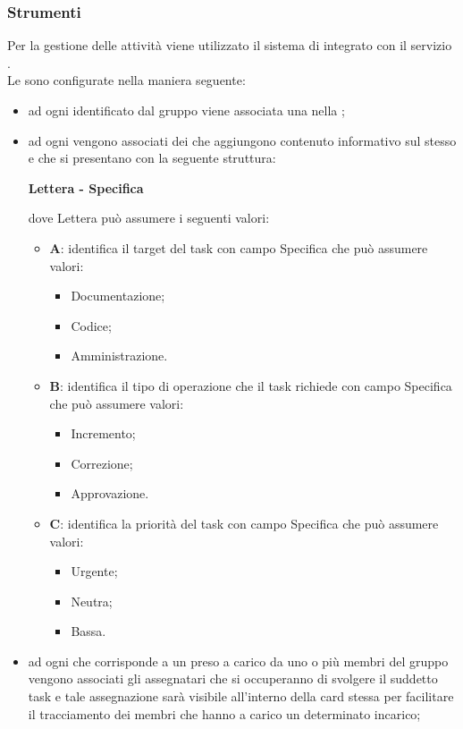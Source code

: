 	\subsubsection{Strumenti}
	Per la gestione delle attività viene utilizzato il sistema di  integrato con il servizio .\\
	Le  sono configurate nella maniera seguente:
	\begin{itemize}
		\item ad ogni  identificato dal gruppo viene associata una  nella ;
		\item ad ogni  vengono associati dei  che aggiungono contenuto informativo sul  stesso e che si presentano con la seguente struttura:
		\begin{center}
 			{\bfseries Lettera - Specifica}
 		\end{center}
dove Lettera può assumere i seguenti valori:
		\begin{itemize}
			\item \textbf{A}: identifica il target del task con campo Specifica che può assumere valori:
			\begin{itemize}
				\item Documentazione;
				\item Codice;
				\item Amministrazione.
			\end{itemize}
			\item \textbf{B}: identifica il tipo di operazione che il task richiede con campo Specifica che può assumere valori:
			\begin{itemize}
				\item Incremento;
				\item Correzione;
				\item Approvazione.
			\end{itemize}
			\item \textbf{C}: identifica la priorità del task con campo Specifica che può assumere valori:
			\begin{itemize}
				\item Urgente;
				\item Neutra;
				\item Bassa.
			\end{itemize}
		\end{itemize}
		\item ad ogni  che corrisponde a un  preso a carico da uno o più membri del gruppo vengono associati gli assegnatari che si occuperanno di svolgere il suddetto task e tale assegnazione sarà visibile all'interno della card stessa per facilitare il tracciamento dei membri che hanno a carico un determinato incarico;

\end{itemize}
